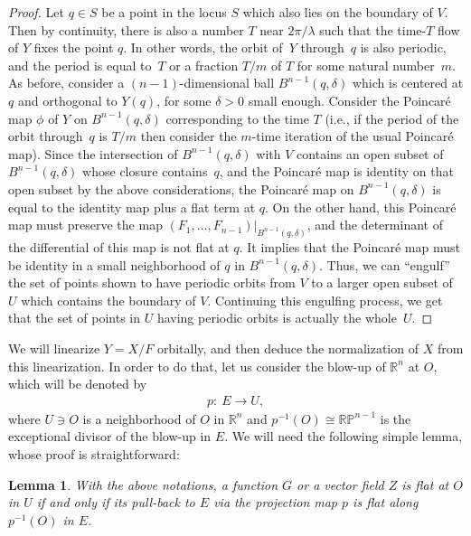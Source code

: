 \documentclass[pdftex]{sigma}
\numberwithin{equation}{section}
\newtheorem{lem}[thm]{Lemma}
\newcommand{\bbR}{\mathbb R}
\newcommand{\bbP}{\mathbb P}
\begin{document}
\begin{proof}
Let $q \in S$ be a point in the locus $S$ which also lies on the boundary of $V$. Then by continuity, there is also
a number $T$ near $2\pi/\lambda$ such that the time-$T$ f\/low of $Y$ f\/ixes the point $q$. In other words, the orbit
of~$Y$ through~$q$ is also periodic, and the period is equal to~$T$ or a fraction $T/m$ of $T$ for some natural
number~$m$. As before, consider a $(n-1)$-dimensional
ball $B^{n-1}(q, \delta)$ which is centered at $q$ and orthogonal to $Y(q)$, for some $\delta > 0$ small enough.
Consider the Poincar\'e map $\phi$ of $Y$ on $B^{n-1}(q, \delta)$ corresponding to the time $T$ (i.e., if the period of the
orbit through~$q$ is $T/m$ then consider the $m$-time iteration of the usual Poincar\'e map). Since the intersection of
${B^{n-1}(q, \delta)}$ with $V$ contains an open subset of $B^{n-1}(q, \delta)$ whose closure contains~$q$, and
the Poincar\'e map is identity on that open subset by the above considerations, the Poincar\'e map on $B^{n-1}(q, \delta)$
is equal to the identity map plus a f\/lat term at $q$. On the other hand, this Poincar\'e map must preserve the
map $(F_1,\dots,F_{n-1})|_{B^{n-1}(q, \delta)}$, and the determinant of the dif\/ferential of this map is not f\/lat at $q$.
It implies that the Poincar\'e map must be identity in a small neighborhood of $q$ in ${B^{n-1}(q, \delta)}$. Thus, we can ``engulf'' the set of points shown to have periodic orbits from $V$ to a larger open subset of $U$ which contains the boundary of $V$. Continuing this
engulf\/ing process, we get that the set of points in $U$ having periodic orbits is actually the whole~$U$.
\end{proof}

 We will linearize $Y = X/F$ orbitally, and then deduce the normalization of $X$ from this linearization. In order to do that,
let us consider the blow-up of $\bbR^n$ at $O$, which will be denoted by
\begin{gather*}
 p\colon \ E \to U,
\end{gather*}
where $U \ni O$ is a neighborhood of $O$ in $\bbR^n$ and $p^{-1}(O) \cong \bbR \bbP^{n-1}$ is the exceptional
divisor of the blow-up in $E$. We will need the following simple lemma, whose proof is straightforward:

\begin{lem} \label{lem:blowup}
With the above notations, a function $G$ or a vector field $Z$ is flat at $O$ in $U$ if and only if its pull-back to
$E$ via the projection map $p$ is flat along $p^{-1}(O)$ in $E$.
\end{lem}
\end{document}
